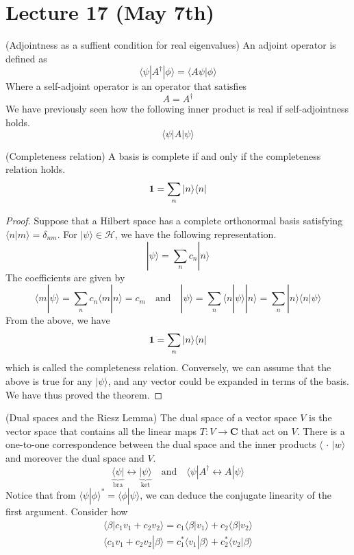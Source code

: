 \section{Lecture 17 (May 7th)}
\begin{defi}
(Adjointness as a suffient condition for real eigenvalues) An adjoint operator is defined as 
\[\langle \psi|A^{\dagger}|\phi \rangle =\langle A\psi | \phi \rangle\]
Where a self-adjoint operator is an operator that satisfies
\[A=A^{\dagger}\]
We have previously seen how the following inner product is real if self-adjointness holds.
\[\langle \psi |A|\psi \rangle  \]
\end{defi}
\vspace{2ex}
\begin{thm}
(Completeness relation) A basis is complete if and only if the completeness relation holds. 
\[{\bf 1}=\sum _{n}|n\rangle \langle n|\]
\end{thm}
\vspace{2ex}
\begin{proof}
Suppose that a Hilbert space has a complete orthonormal basis satisfying $\langle n|m\rangle =\delta _{nm}$. For $|\psi \rangle \in \mathcal{H}$, we have the following representation.
\[|\psi \rangle =\sum _{n}c_{n}|n\rangle \]
The coefficients are given by
\[\langle m|\psi \rangle =\sum _{n}c_{n}\langle m|n\rangle =c_{m}\quad \mathrm{and}\quad |\psi \rangle =\sum _{n}\langle n|\psi \rangle |n\rangle=\sum _{n}|n\rangle \langle n|\psi \rangle  \]
From the above, we have
\[{\bf 1}=\sum _{n}|n\rangle \langle n|\]
which is called the completeness relation. Conversely, we can assume that the above is true for any $|\psi \rangle $, and any vector could be expanded in terms of the basis. We have thus proved the theorem.
\end{proof}
\vspace{2ex}
\begin{defi}
(Dual spaces and the Riesz Lemma) The dual space of a vector space $V$ is the vector space that contains all the linear maps $T:V\rightarrow {\bm C}$ that act on $V$. There is a one-to-one correspondence between the dual space and the inner products $\langle\, \cdot \,|w\rangle $ and moreover the dual space and $V$. 
\[ \underbrace{\langle \psi |}_{\mathrm{bra}}\longleftrightarrow \underbrace{|\psi \rangle}_{\mathrm{ket}}\quad \mathrm{and}\quad \langle \psi |A^{\dagger}\longleftrightarrow A|\psi \rangle \]
Notice that from $\langle \psi |\phi \rangle ^{*}=\langle \phi |\psi \rangle $, we can deduce the conjugate linearity of the first argument. Consider how 
\begin{align*}
\langle \beta |c_1v_1+c_2v_2\rangle =c_1\langle \beta |v_1\rangle +c_2\langle \beta |v_2\rangle \\
\langle c_1v_1+c_2v_2|\beta \rangle =c_1^{*}\langle v_1|\beta \rangle +c_2^{*}\langle v_2|\beta \rangle 
\end{align*}
\end{defi}
